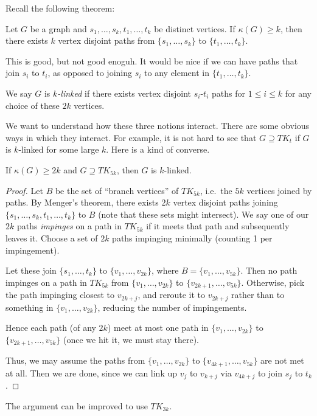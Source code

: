 \documentclass[a4paper]{article}
\begin{document}
Recall the following theorem:
\begin{thm}
  Let $G$ be a graph and $s_1, \ldots, s_k, t_1, \ldots, t_k$ be distinct vertices. If $\kappa(G) \geq k$, then there exists $k$ vertex disjoint paths from $\{s_1, \ldots, s_k\}$ to $\{t_1, \ldots, t_k\}$.
\end{thm}

This is good, but not good enoguh. It would be nice if we can have paths that join $s_i$ to $t_i$, as opposed to joining $s_i$ to any element in $\{t_1, \ldots, t_k\}$.

\begin{defi}
  We say $G$ is \emph{$k$-linked} if there exists vertex disjoint $s_i$-$t_i$ paths for $1 \leq i \leq k$ for any choice of these $2k$ vertices.
\end{defi}

We want to understand how these three notions interact. There are some obvious ways in which they interact. For example, it is not hard to see that $G \supseteq TK_t$ if $G$ is $k$-linked for some large $k$. Here is a kind of converse.
\begin{lemma}
  If $\kappa(G) \geq 2k$ and $G \supseteq TK_{5k}$, then $G$ is $k$-linked.
\end{lemma}

\begin{proof}
  Let $B$ be the set of ``branch vertices'' of $TK_{5k}$, i.e.\ the $5k$ vertices joined by paths. By Menger's theorem, there exists $2k$ vertex disjoint paths joining $\{s_1, \ldots, s_k, t_1, \ldots, t_k\}$ to $B$ (note that these sets might intersect). We say one of our $2k$ paths \emph{impinges} on a path in $TK_{5k}$ if it meets that path and subsequently leaves it. Choose a set of $2k$ paths impinging minimally (counting 1 per impingement).

  Let these join $\{s_1, \ldots, t_k\}$ to $\{v_1, \ldots, v_{2k}\}$, where $B = \{v_1, \ldots, v_{5k}\}$. Then no path impinges on a path in $TK_{5k}$ from $\{v_1, \ldots, v_{2k}\}$ to $\{v_{2k + 1}, \ldots, v_{5k}\}$. Otherwise, pick the path impinging closest to $v_{2k + j}$, and reroute it to $v_{2k + j}$ rather than to something in $\{v_1, \ldots, v_{2k}\}$, reducing the number of impingements.

  Hence each path (of any $2k$) meet at most one path in $\{v_1, \ldots, v_{2k}\}$ to $\{v_{2k + 1}, \ldots, v_{5k}\}$ (once we hit it, we must stay there).

  Thus, we may assume the paths from $\{v_1, \ldots, v_{2k}\}$ to $\{v_{4k + 1}, \ldots, v_{5k}\}$ are not met at all. Then we are done, since we can link up $v_j$ to $v_{k + j}$ via $v_{4k + j}$ to join $s_j$ to $t_k$.
\end{proof}
The argument can be improved to use $TK_{3k}$.
\end{document}
